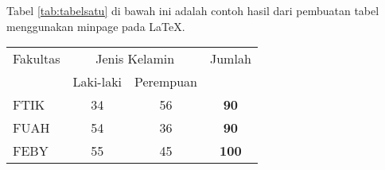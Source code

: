 \documentclass[12pt, times new roman]{article}
\begin{document}
Tabel \ref{tab:tabelsatu} di bawah ini adalah contoh hasil dari pembuatan tabel menggunakan minpage pada LaTeX.\\
\begin{center}
  \begin{minipage}{\textwidth}
    \begin{center}
      \label{tab:tabelsatu}
      \begin{tabular}{|l|c|c|c|}
        \hline
        Fakultas & \multicolumn{2}{|c|}{Jenis Kelamin} & Jumlah\\
        \cline{2-3} {} & {Laki-laki} & {Perempuan} & {}\\
        \hline
        FTIK & 34 & 56 & \textbf{90}\\
        FUAH & 54 & 36 & \textbf{90}\\
        FEBY & 55 & 45 & \textbf{100}\\
        \hline
      \end{tabular}
    \end{center}
  \end{minipage}
\end{center}
\end{document}
